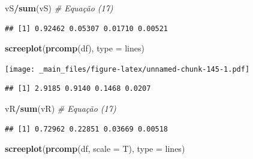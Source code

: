 \documentclass[
]{book}
\newenvironment{Shaded}{\begin{snugshade}}{\end{snugshade}}
\newcommand{\CommentTok}[1]{\textcolor[rgb]{0.56,0.35,0.01}{\textit{#1}}}
\newcommand{\DataTypeTok}[1]{\textcolor[rgb]{0.13,0.29,0.53}{#1}}
\newcommand{\KeywordTok}[1]{\textcolor[rgb]{0.13,0.29,0.53}{\textbf{#1}}}
\newcommand{\NormalTok}[1]{#1}
\newcommand{\OperatorTok}[1]{\textcolor[rgb]{0.81,0.36,0.00}{\textbf{#1}}}
\newcommand{\StringTok}[1]{\textcolor[rgb]{0.31,0.60,0.02}{#1}}
\theoremstyle{definition}
\theoremstyle{definition}
\theoremstyle{definition}
\theoremstyle{remark}
\begin{document}
\begin{Shaded}
\begin{Highlighting}[]
\NormalTok{vS}\OperatorTok{/}\KeywordTok{sum}\NormalTok{(vS)  }\CommentTok{\# Equação (17)}
\end{Highlighting}
\end{Shaded}

\begin{verbatim}
## [1] 0.92462 0.05307 0.01710 0.00521
\end{verbatim}

\begin{Shaded}
\begin{Highlighting}[]
\KeywordTok{screeplot}\NormalTok{(}\KeywordTok{prcomp}\NormalTok{(df), }\DataTypeTok{type =} \StringTok{\textquotesingle{}lines\textquotesingle{}}\NormalTok{)}
\end{Highlighting}
\end{Shaded}

\texttt{[image: \_main\_files/figure-latex/unnamed-chunk-145-1.pdf]}

\begin{Shaded}
\end{Shaded}

\begin{verbatim}
## [1] 2.9185 0.9140 0.1468 0.0207
\end{verbatim}

\begin{Shaded}
\begin{Highlighting}[]
\NormalTok{vR}\OperatorTok{/}\KeywordTok{sum}\NormalTok{(vR)  }\CommentTok{\# Equação (17)}
\end{Highlighting}
\end{Shaded}

\begin{verbatim}
## [1] 0.72962 0.22851 0.03669 0.00518
\end{verbatim}

\begin{Shaded}
\begin{Highlighting}[]
\KeywordTok{screeplot}\NormalTok{(}\KeywordTok{prcomp}\NormalTok{(df, }\DataTypeTok{scale =}\NormalTok{ T), }\DataTypeTok{type =} \StringTok{\textquotesingle{}lines\textquotesingle{}}\NormalTok{)}
\end{Highlighting}
\end{Shaded}
\end{document}
